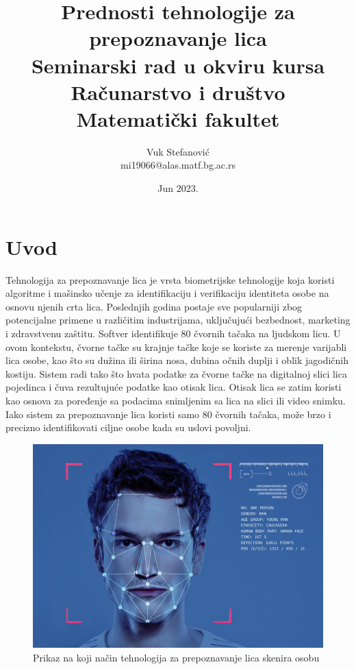 \documentclass[a4paper]{article}
\begin{document}
\title{Prednosti tehnologije za prepoznavanje lica\\ \small{Seminarski rad u okviru kursa\\Računarstvo i društvo\\ Matematički fakultet}}

\author{Vuk Stefanović\\ mi19066@alas.matf.bg.ac.rs}
\date{Jun 2023.}
\maketitle

\tableofcontents

\newpage

\section{Uvod}
\label{sec:uvod}
Tehnologija za prepoznavanje lica je vrsta biometrijske tehnologije koja koristi algoritme i mašinsko učenje za identifikaciju i verifikaciju identiteta osobe na osnovu njenih crta lica. Poslednjih godina postaje sve popularniji zbog potencijalne primene u različitim industrijama, uključujući bezbednost, marketing i zdravstvenu zaštitu. Softver identifikuje 80 čvornih tačaka na ljudskom licu. U ovom kontekstu, čvorne tačke su krajnje tačke koje se koriste za merenje varijabli lica osobe, kao što su dužina ili širina nosa, dubina očnih duplji i oblik jagodičnih kostiju. Sistem radi tako što hvata podatke za čvorne tačke na digitalnoj slici lica pojedinca i čuva rezultujuće podatke kao otisak lica. Otisak lica se zatim koristi kao osnova za poređenje sa podacima snimljenim sa lica na slici ili video snimku. Iako sistem za prepoznavanje lica koristi samo 80 čvornih tačaka, može brzo i precizno identifikovati ciljne osobe kada su uslovi povoljni.\cite{1}
\begin{figure}[h!]
	\begin{center}
		\includegraphics[scale=0.2]{image1.png}
	\end{center}
	\caption{Prikaz na koji način tehnologija za prepoznavanje lica skenira osobu}
\end{figure}
\end{document}
